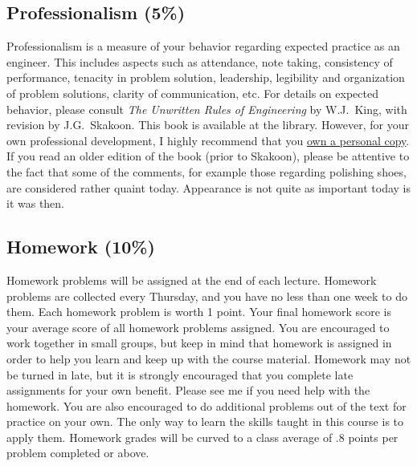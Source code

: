 \documentclass[10pt]{article}
\begin{document}
\subsection{Professionalism (5\%)}
Professionalism is a measure of your behavior regarding expected practice as an engineer. This includes aspects such as attendance, note taking, consistency of performance, tenacity in problem solution, leadership, legibility and organization of problem solutions, clarity of communication, etc. For details on expected behavior, please consult \emph{The Unwritten Rules of Engineering} by W.J.~King, with revision by  J.G.~Skakoon. This book is available at the library. However, for your own professional development, I highly recommend that you \href{http://members.asme.org/catalog/ItemView.cfm?ItemNumber=801624}{own a personal copy}. If you read an older edition of the book (prior to Skakoon), please be attentive to the fact that some of the comments, for example those regarding polishing shoes, are considered rather quaint today. Appearance is not quite as important today is it was then.  

\subsection{Homework (10\%)}
Homework problems will be assigned at the end of each lecture. Homework problems are collected every Thursday, and you have no less than one week to do them.   
Each homework problem is worth 1 point.  Your final homework score is your average score of all homework problems assigned.  You are encouraged to work together in small groups, but keep in mind that homework is assigned in order to help you learn and keep up with the course material. 
Homework may not be turned in late, but it is strongly encouraged that you complete late assignments for your own benefit. Please see me if you need help with the homework. You are also encouraged to do additional problems out of the text for practice on your own. The only way to learn the skills taught in this course is to apply them. Homework grades will be curved to a class average of .8 points per problem completed or above.
\end{document}
